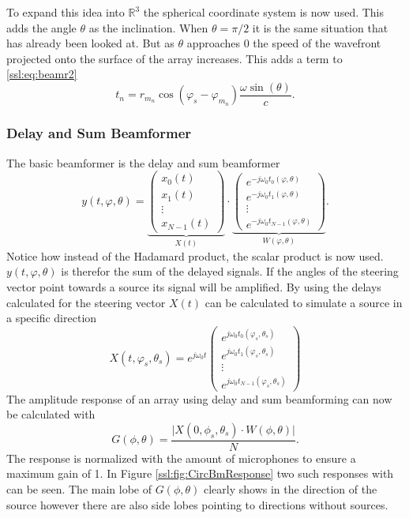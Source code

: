 To expand this idea into $\mathbb{R}^3$ the spherical coordinate system is now used.
This adds the angle $\theta$ as the inclination.
When $\theta = \pi/2$ it is the same situation that has already been looked at.
But as $\theta$ approaches 0 the speed of the wavefront projected onto the
surface of the array increases. 
This adds a term to \eqref{ssl:eq:beamr2}
\begin{equation}
	t_n = 
	r_{m_n} \cos(\varphi_s - \varphi_{m_n})
	\frac{\omega \sin(\theta)}{c}.
  \label{ssl:eq:beamr3}
\end{equation}

\subsubsection{Delay and Sum Beamformer}
The basic beamformer is the delay and sum beamformer
\begin{equation}
	\label{ssl:eq:delAndSum}
	y(t, \varphi, \theta) = 
	  \underbrace{
		\begin{pmatrix} 
		  x_0(t) \\ 
		  x_1(t) \\
		  \vdots \\ 
		  x_{N-1}(t)
	  \end{pmatrix}}_{X(t)}
	  \cdot
	  \underbrace{
		\begin{pmatrix} 
			e^{-j\omega_0 t_0(\varphi, \theta)} \\ 
			e^{-j\omega_0 t_1(\varphi, \theta)} \\
			\vdots \\ 
			e^{-j\omega_0 t_{N-1}(\varphi, \theta)} 
		\end{pmatrix}}_{W(\varphi, \theta)}.
\end{equation}
Notice how instead of the Hadamard product, the scalar product is now used.
$y(t, \varphi, \theta)$ is therefor the sum of the delayed signals.
If the angles of the steering vector point towards a source its 
signal will be amplified.
By using the delays calculated for the steering vector $X(t)$ can
be calculated to simulate a source in a specific direction
\begin{equation}
	X(t, \varphi_s, \theta_s) = 
	e^{j\omega_0 t}
	\begin{pmatrix} 
		e^{j\omega_0 t_0(\varphi_s, \theta_s)} \\ 
		e^{j\omega_0 t_1(\varphi_s, \theta_s)} \\
		\vdots \\ 
		e^{j\omega_0 t_{N-1}(\varphi_s, \theta_s)} 
	\end{pmatrix}
\end{equation}
The amplitude response of an array using delay and sum beamforming can
now be calculated with
\begin{equation}
	G(\phi, \theta) = 
	\frac{
		\lvert X(0, \phi_s, \theta_s) \cdot W(\phi, \theta) \rvert}
	{
		N
	}.
\end{equation}
The response is normalized with the amount of microphones to ensure a maximum
gain of 1.
In Figure \ref*{ssl:fig:CircBmResponse} two such responses with can be seen.
The main lobe of $G(\phi, \theta)$ clearly shows in the direction of the source
however there are also side lobes pointing to directions without sources.


